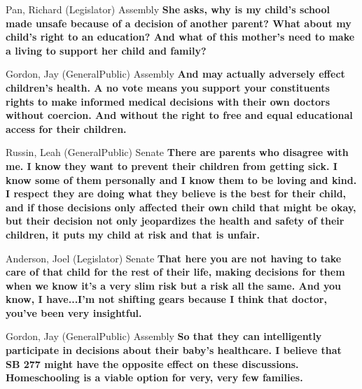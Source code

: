 \begin{result}{15.03620730889844}{Pan, Richard (Legislator) Assembly}
\textbf{She asks, why is my child's school made unsafe because of a decision of another parent? What about my child's right to an education? And what of this mother's need to make a living to support her child and family?
}\end{result}

\begin{result}{14.527732171017536}{Gordon, Jay (GeneralPublic) Assembly}
\textbf{And may actually adversely effect children's health. A no vote means you support your constituents rights to make informed medical decisions with their own doctors without coercion. And without the right to free and equal educational access for their children.
}\end{result}

\begin{result}{14.1432066442995}{Russin, Leah (GeneralPublic) Senate}
\textbf{There are parents who disagree with me. I know they want to prevent their children from getting sick. I know some of them personally and I know them to be loving and kind. I respect they are doing what they believe is the best for their child, and if those decisions only affected their own child that might be okay, but their decision not only jeopardizes the health and safety of their children, it puts my child at risk and that is unfair.
}\end{result}

\begin{result}{12.773276729732682}{Anderson, Joel (Legislator) Senate}
\textbf{That here you are not having to take care of that child for the rest of their life, making decisions for them when we know it's a very slim risk but a risk all the same. And you know, I have...I'm not shifting gears because I think that doctor, you've been very insightful.
}\end{result}

\begin{result}{12.361160896976774}{Gordon, Jay (GeneralPublic) Assembly}
\textbf{So that they can intelligently participate in decisions about their baby's healthcare. I believe that SB 277 might have the opposite effect on these discussions. Homeschooling is a viable option for very, very few families.
}\end{result}

